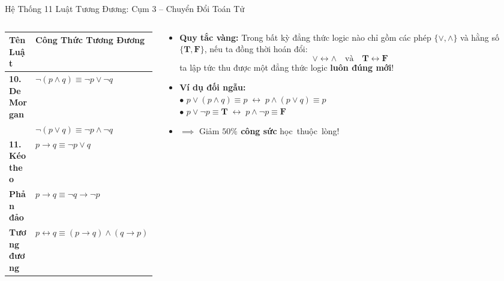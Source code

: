 \documentclass[aspectratio=169, 10pt]{beamer}
\begin{document}
\begin{frame}{Hệ Thống 11 Luật Tương Đương: Cụm 3 -- Chuyển Đổi Toán Tử}
  \begin{columns}[t, onlytextwidth]
    \begin{column}{0.51\textwidth}
      \begin{cozyDef}
        \centering
        \renewcommand{\arraystretch}{1.08}
        \small
        \setlength{\tabcolsep}{2.5pt}
        \begin{tabular}{ll}
          \toprule
          \textbf{Tên Luật} & \textbf{Công Thức Tương Đương} \\
          \midrule
          \textbf{10. De Morgan} & $\neg(p \land q) \equiv \neg p \lor \neg q$ \\
                                 & $\neg(p \lor q) \equiv \neg p \land \neg q$ \\
          \textbf{11. Kéo theo}  & $p \to q \equiv \neg p \lor q$ \\
          \textbf{Phản đảo}      & $p \to q \equiv \neg q \to \neg p$ \\
          \textbf{Tương đương}   & $p \leftrightarrow q \equiv (p \to q) \land (q \to p)$ \\
          \bottomrule
        \end{tabular}
      \end{cozyDef}
    \end{column}
    \begin{column}{0.47\textwidth}
      \begin{cozyInsight}
        \small
        \begin{itemize}
          \setlength{\itemsep}{1.5pt}
          \item \textbf{Quy tắc vàng:} Trong bất kỳ đẳng thức logic nào chỉ gồm các phép $\{\lor, \land\}$ và hằng số $\{\mathbf{T}, \mathbf{F}\}$, nếu ta đồng thời hoán đổi:
          $$\lor \longleftrightarrow \land \quad \text{và} \quad \mathbf{T} \longleftrightarrow \mathbf{F}$$
          ta lập tức thu được một đẳng thức logic \textbf{luôn đúng mới}!
          \item \textbf{Ví dụ đối ngẫu:}\\
          {\footnotesize $\bullet$ $p \lor (p \land q) \equiv p \;\longleftrightarrow\; p \land (p \lor q) \equiv p$}\\
          {\footnotesize $\bullet$ $p \lor \neg p \equiv \mathbf{T} \;\longleftrightarrow\; p \land \neg p \equiv \mathbf{F}$}
          \item $\implies$ Giảm \textbf{$50\%$ công sức} học~thuộc~lòng!
        \end{itemize}
      \end{cozyInsight}
    \end{column}
  \end{columns}
\end{frame}
\end{document}
